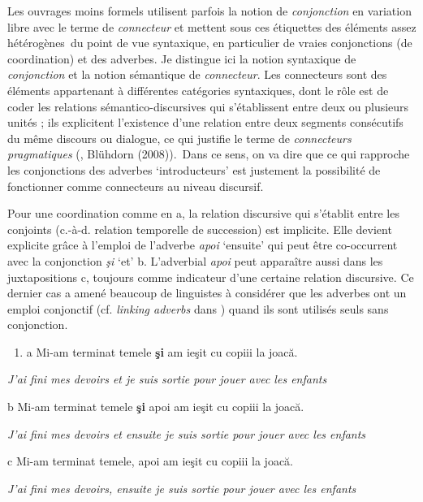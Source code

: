 Les ouvrages moins formels utilisent parfois la notion de \textit{conjonction} en variation libre avec le terme de \textit{connecteur} et mettent sous ces étiquettes des éléments assez hétérogènes~du point de vue syntaxique, en particulier de vraies conjonctions (de coordination) et des adverbes. Je distingue ici la notion syntaxique de \textit{conjonction} et la notion sémantique de \textit{connecteur}. Les connecteurs sont des éléments appartenant à différentes catégories syntaxiques, dont le rôle est de coder les relations sémantico-discursives qui s'établissent entre deux ou plusieurs unités ; ils explicitent l'existence d'une relation entre deux segments consécutifs du même discours ou dialogue, ce qui justifie le terme de \textit{connecteurs pragmatiques} (\citet{Berrendonner1983}, Blühdorn (2008)).~Dans ce sens, on va dire que ce qui rapproche les conjonctions des adverbes `introducteurs' est justement la possibilité de fonctionner comme connecteurs au niveau discursif.

Pour une coordination comme en a, la relation discursive qui s'établit entre les conjoints (c.-à-d. relation temporelle de succession) est implicite. Elle devient explicite grâce à l'emploi de l'adverbe \textit{apoi} `ensuite' qui peut être co-occurrent avec la conjonction \textit{şi} `et' b. L'adverbial \textit{apoi} peut apparaître aussi dans les juxtapositions c, toujours comme indicateur d'une certaine relation discursive. Ce dernier cas a amené beaucoup de linguistes à considérer que les adverbes ont un emploi conjonctif (cf. \textit{linking adverbs} dans \citet{Haspelmath2007}) quand ils sont utilisés seuls sans conjonction. 


\begin{enumerate}
\item \label{bkm:Ref272700213}a  Mi-am terminat temele \textbf{şi} am ieşit cu copiii la joacă.


\end{enumerate}
{\itshape
J'ai fini mes devoirs et je suis sortie pour jouer avec les enfants}

  b  Mi-am terminat temele \textbf{şi} apoi am ieşit cu copiii la joacă.

{\itshape
J'ai fini mes devoirs et ensuite je suis sortie pour jouer avec les enfants}

  c  Mi-am terminat temele, apoi am ieşit cu copiii la joacă.

    \textit{J'ai fini mes devoirs, ensuite je suis sortie pour jouer avec les enfants}

